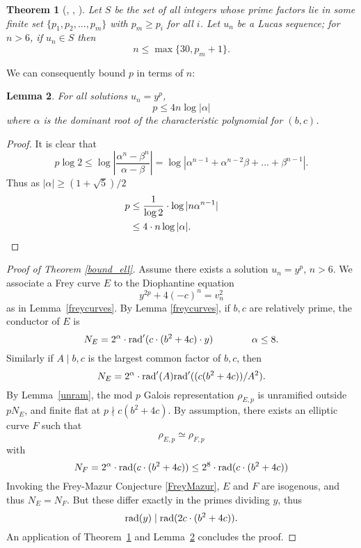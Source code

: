 \documentclass[12pt]{amsart}
\newtheorem{thm}{Theorem}[section]
\newtheorem{lem}[thm]{Lemma}
\theoremstyle{definition}
\theoremstyle{remark}
\newcommand{\rad}{{\rm{rad}}}
\newcommand{\notdiv}{\nmid}
\newcommand{\bfrac}[2]{\left| \frac{#1}{#2} \right|}
\begin{document}
\begin{thm}[\cite{gyory81}, \cite{gyory82}, \cite{gyory03}]\label{smoothterm}
Let $S$ be the set of all integers whose prime factors lie in some finite set $\{p_1,p_2,...,p_m\}$ with $p_m \geq p_i$ for all $i$.  Let $u_n$ be a Lucas sequence; for $n > 6$, if $u_n \in S$ then
\[ n \leq \max\{30, p_m +1 \}. \]
\end{thm}

We can consequently bound $p$ in terms of $n$:

\begin{lem}\label{boundpintermsn}
For all solutions $u_n = y^p$, 
\[ p \leq 4n \log|\alpha|  \]
where $\alpha$ is the dominant root of the characteristic polynomial for $(b,c)$.
\end{lem}

\begin{proof}
It is clear that
\[p\log{2} \leq \log \bfrac{\alpha^n - \beta^n}{\alpha-\beta}  = \log|\alpha^{n-1}+ \alpha^{n-2}\beta+...+\beta^{n-1}|. \]
Thus as $|\alpha| \geq (1 + \sqrt{5})/2$ 
\begin{align*}
p & \leq  \frac{1}{\log{2}} \cdot \log|n\alpha^{n-1}| \\
 & \leq 4\cdot n \log|\alpha|. && \qedhere
\end{align*}
\end{proof}


\begin{proof}[Proof of Theorem \ref{bound_ell}]
Assume there exists a solution $u_n = y^p$, $n > 6$.
We associate a Frey curve $E$ to the Diophantine equation
\[ y^{2p} +4(-c)^n = v_n^2 \]
as in Lemma~\ref{freycurves}.  By Lemma \ref{freycurves}, if $b,c$ are relatively prime, the conductor of $E$ is
\[ N_E = 2^{\alpha}  \cdot \rad'( c \cdot (b^2+4c) \cdot y) \qquad \qquad \alpha \leq 8. \]
Similarly if $A \mid b,c$ is the largest common factor of $b,c$, then
\[ N_E = 2^{\alpha} \cdot \rad'(A)\rad'((c(b^2+4c))/A^2). \]
By Lemma~\ref{unram}, the mod $p$ Galois representation $\rho_{E,p}$ is unramified outside $pN_E$, and finite flat at $p \notdiv c(b^2+4c)$. By assumption, there exists an elliptic curve $F$ such that
\[ \rho_{E,p} \simeq \rho_{F,p} \]  
with
\[N_F = 2^{\alpha} \cdot  \rad( c \cdot (b^2+4c)) \leq 2^8 \cdot \rad(c \cdot (b^2+4c))  \]
Invoking the Frey-Mazur Conjecture \ref{FreyMazur}, $E$ and $F$ are isogenous, and thus $N_E = N_F$.  But these differ exactly in the primes dividing $y$, thus
\[ \rad(y) \mid \rad(2c \cdot (b^2+4c)). \]
 An application of Theorem~\ref{smoothterm} and Lemma~\ref{boundpintermsn} concludes the proof.
\end{proof}
\end{document}
